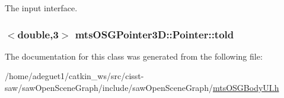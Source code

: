 The input interface. 

\hypertarget{classmts_o_s_g_pointer3_d_1_1_pointer_ac94be80751edb5e58d4ee60957cdd3a3}{
\subsubsection[{told}]{$<$double,3$>$ mts\-O\-S\-G\-Pointer3\-D\-::\-Pointer\-::told}}\label{classmts_o_s_g_pointer3_d_1_1_pointer_ac94be80751edb5e58d4ee60957cdd3a3}


The documentation for this class was generated from the following file\-:\begin{DoxyCompactItemize}
\item 
/home/adeguet1/catkin\-\_\-ws/src/cisst-\/saw/saw\-Open\-Scene\-Graph/include/saw\-Open\-Scene\-Graph/\hyperlink{mts_o_s_g_body_u_i_8h}{mts\-O\-S\-G\-Body\-U\-I.\-h}\end{DoxyCompactItemize}
